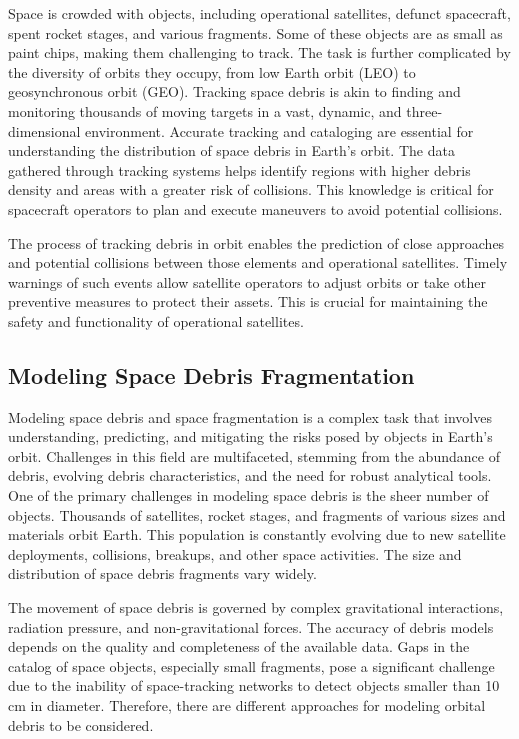 \documentclass[11pt]{article} %
\begin{document}
Space is crowded with objects, including operational satellites, defunct spacecraft, spent rocket stages, and various fragments. Some of these objects are as small as paint chips, making them challenging to track. The task is further complicated by the diversity of orbits they occupy, from low Earth orbit (LEO) to geosynchronous orbit (GEO). Tracking space debris is akin to finding and monitoring thousands of moving targets in a vast, dynamic, and three-dimensional environment. Accurate tracking and cataloging are essential for understanding the distribution of space debris in Earth's orbit. The data gathered through tracking systems helps identify regions with higher debris density and areas with a greater risk of collisions. This knowledge is critical for spacecraft operators to plan and execute maneuvers to avoid potential collisions.~\cite{watson_optical_2019}

The process of tracking debris in orbit enables the prediction of close approaches and potential collisions between those elements and operational satellites. Timely warnings of such events allow satellite operators to adjust orbits or take other preventive measures to protect their assets. This is crucial for maintaining the safety and functionality of operational satellites.~\cite{noauthor_space_nodate}

\subsection{Modeling Space Debris Fragmentation}

Modeling space debris and space fragmentation is a complex task that involves understanding, predicting, and mitigating the risks posed by objects in Earth's orbit. Challenges in this field are multifaceted, stemming from the abundance of debris, evolving debris characteristics, and the need for robust analytical tools. One of the primary challenges in modeling space debris is the sheer number of objects. Thousands of satellites, rocket stages, and fragments of various sizes and materials orbit Earth. This population is constantly evolving due to new satellite deployments, collisions, breakups, and other space activities. The size and distribution of space debris fragments vary widely.~\cite{noauthor_debris_nodate}

The movement of space debris is governed by complex gravitational interactions, radiation pressure, and non-gravitational forces. The accuracy of debris models depends on the quality and completeness of the available data. Gaps in the catalog of space objects, especially small fragments, pose a significant challenge due to the inability of space-tracking networks to detect objects smaller than 10 cm in diameter. Therefore, there are different approaches for modeling orbital debris to be considered.
\end{document}
